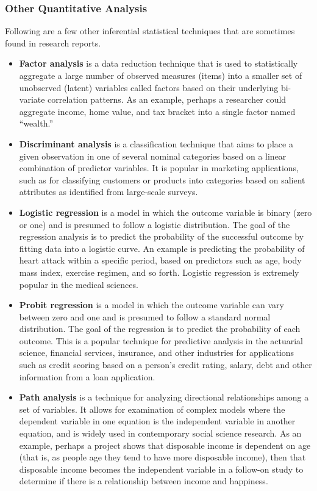 \subsubsection{Other Quantitative Analysis}

Following are a few other inferential statistical techniques that are sometimes found in research reports.

\begin{itemize}
	\item \textbf{Factor analysis} is a data reduction technique that is used to statistically aggregate a large number of observed measures (items) into a smaller set of unobserved (latent) variables called factors based on their underlying bi-variate correlation patterns. As an example, perhaps a researcher could aggregate income, home value, and tax bracket into a single factor named ``wealth.''

	\item \textbf{Discriminant analysis} is a classification technique that aims to place a given observation in one of several nominal categories based on a linear combination of predictor variables. It is popular in marketing applications, such as for classifying customers or products into categories based on salient attributes as identified from large-scale surveys.

	\item \textbf{Logistic regression} is a model in which the outcome variable is binary (zero or one) and is presumed to follow a logistic distribution. The goal of the regression analysis is to predict the probability of the successful outcome by fitting data into a logistic curve. An example is predicting the probability of heart attack within a specific period, based on predictors such as age, body mass index, exercise regimen, and so forth. Logistic regression is extremely popular in the medical sciences. 

	\item \textbf{Probit regression} is a model in which the outcome variable can vary between zero and one and is presumed to follow a standard normal distribution. The goal of the regression is to predict the probability of each outcome. This is a popular technique for predictive analysis in the actuarial science, financial services, insurance, and other industries for applications such as credit scoring based on a person's credit rating, salary, debt and other information from a loan application.

	\item \textbf{Path analysis} is a technique for analyzing directional relationships among a set of variables. It allows for examination of complex models where the dependent variable in one equation is the independent variable in another equation, and is widely used in contemporary social science research. As an example, perhaps a project shows that disposable income is dependent on age (that is, as people age they tend to have more disposable income), then that disposable income becomes the independent variable in a follow-on study to determine if there is a relationship between income and happiness.


\end{itemize}
